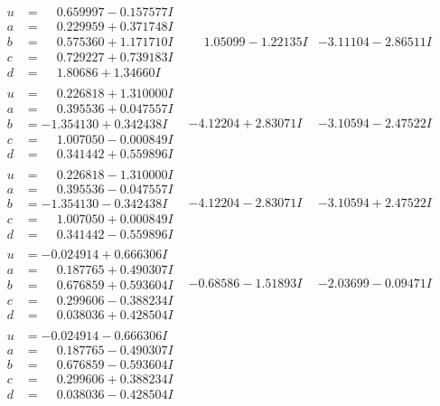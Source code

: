 \documentclass[1p]{elsarticle_modified}
\theoremstyle{definition}
\begin{document}
$$\begin{array}{c|c|c}
\begin{aligned}
u &= \phantom{-}0.659997 - 0.157577 I \\
a &= \phantom{-}0.229959 + 0.371748 I \\
b &= \phantom{-}0.575360 + 1.171710 I \\
c &= \phantom{-}0.729227 + 0.739183 I \\
d &= \phantom{-}1.80686 + 1.34660 I\end{aligned}
 & \phantom{-}1.05099 - 1.22135 I & -3.11104 - 2.86511 I \\ \hline\begin{aligned}
u &= \phantom{-}0.226818 + 1.310000 I \\
a &= \phantom{-}0.395536 + 0.047557 I \\
b &= -1.354130 + 0.342438 I \\
c &= \phantom{-}1.007050 - 0.000849 I \\
d &= \phantom{-}0.341442 + 0.559896 I\end{aligned}
 & -4.12204 + 2.83071 I & -3.10594 - 2.47522 I \\ \hline\begin{aligned}
u &= \phantom{-}0.226818 - 1.310000 I \\
a &= \phantom{-}0.395536 - 0.047557 I \\
b &= -1.354130 - 0.342438 I \\
c &= \phantom{-}1.007050 + 0.000849 I \\
d &= \phantom{-}0.341442 - 0.559896 I\end{aligned}
 & -4.12204 - 2.83071 I & -3.10594 + 2.47522 I \\ \hline\begin{aligned}
u &= -0.024914 + 0.666306 I \\
a &= \phantom{-}0.187765 + 0.490307 I \\
b &= \phantom{-}0.676859 + 0.593604 I \\
c &= \phantom{-}0.299606 - 0.388234 I \\
d &= \phantom{-}0.038036 + 0.428504 I\end{aligned}
 & -0.68586 - 1.51893 I & -2.03699 - 0.09471 I \\ \hline\begin{aligned}
u &= -0.024914 - 0.666306 I \\
a &= \phantom{-}0.187765 - 0.490307 I \\
b &= \phantom{-}0.676859 - 0.593604 I \\
c &= \phantom{-}0.299606 + 0.388234 I \\
d &= \phantom{-}0.038036 - 0.428504 I\end{aligned}

\end{array}$$
\end{document}
